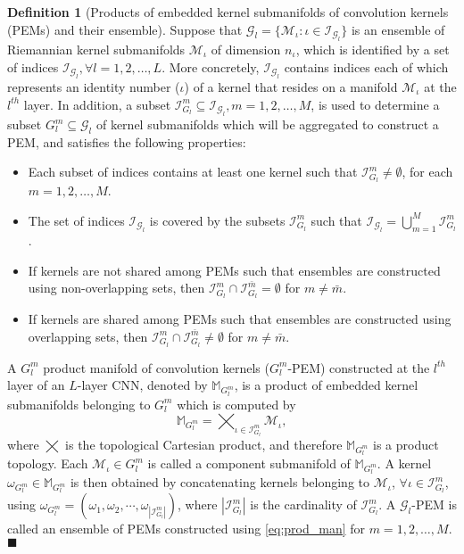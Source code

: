 \documentclass[10pt,journal,compsoc]{IEEEtran}
\theoremstyle{definition}
\newtheorem{definition}[theorem]{Definition}
\theoremstyle{definition}
\theoremstyle{remark}
\theoremstyle{remark}
\theoremstyle{remark}
\newcommand*{\QEDbs}{\hfill\ensuremath{\blacksquare}}%
\begin{document}
\begin{definition}[Products of embedded kernel submanifolds of convolution kernels (PEMs) and their ensemble] 
	Suppose that ${\mathcal{G}_l = \{ \mathcal{M}_{\iota}: \iota \in \mathcal{I}_{\mathcal{G}_l} \}}$ is an ensemble of Riemannian kernel submanifolds $\mathcal{M}_{\iota}$ of dimension $n_{\iota}$, which is identified by a set of indices $\mathcal{I}_{\mathcal{G}_l}, \forall {l=1,2,\ldots,L}$. More concretely, $\mathcal{I}_{\mathcal{G}_l}$ contains indices each of which represents an identity number ($\iota$) of a kernel that resides on a manifold $\mathcal{M}_{\iota}$ at the $l^{th}$ layer. In addition, a subset ${\mathcal{I}_{{G}_l}^m \subseteq \mathcal{I}_{\mathcal{G}_l}}, {m =1,2,\ldots,M}$, is used to determine a subset ${G}^m_l \subseteq \mathcal{G}_l$ of kernel submanifolds  which will be aggregated to construct a PEM, and satisfies the following properties:
	\begin{itemize}
	\item Each subset of indices contains at least one kernel such that ${\mathcal{I}_{{G}_l}^m} \neq \emptyset$, for each $m=1,2,\ldots,M$.	
	\item The set of indices $\mathcal{I}_{\mathcal{G}_l}$ is covered by the subsets ${\mathcal{I}_{{G}_l}^m}$ such that $\mathcal{I}_{\mathcal{G}_l} = \bigcup \limits _{m=1} ^M {\mathcal{I}_{{G}_l}^m}$. 
	\item If kernels are not shared among PEMs such that ensembles are constructed using non-overlapping sets, then $\mathcal{I}_{G_l}^m \cap \mathcal{I}_{{G}_l}^{\bar{m}} = \emptyset$ for $m \neq \bar{m}$.
	\item If kernels are shared among PEMs such that ensembles are constructed using overlapping sets, then ${\mathcal{I}_{G_l}^m \cap \mathcal{I}_{{G}_l}^{\bar{m}} \neq \emptyset}$ for $m \neq \bar{m}$.
	\end{itemize} 
	A $G^m_l$ product manifold of convolution kernels ($G^m_l$-PEM) constructed at the $l^{th}$ layer of an $L$-layer CNN, denoted by $\mathbb{M}_{G^m_l}$, is a product of embedded kernel submanifolds belonging to ${G}^m_l$ which is computed by
\begin{equation}
\mathbb{M}_{G^m_l} = \bigtimes_{\iota \in \mathcal{I}^m_{{G}_l}} \mathcal{M}_{\iota} ,
\label{eq:prod_man}
\end{equation}
where $\bigtimes$ is the topological Cartesian product, and therefore $\mathbb{M}_{G^m_l}$ is a product topology. Each ${\mathcal{M}_{\iota} \in  {G}^m_l}$ is called a component submanifold of $\mathbb{M}_{G^m_l}$. A kernel $\omega_{G^m_l} \in \mathbb{M}_{G^m_l}$ is then obtained by concatenating kernels belonging to $\mathcal{M}_{\iota}$, $\forall \iota \in \mathcal{I}^m_{{G}_l}$, using  ${\omega_{G^m_l} = (\omega_1, \omega_2, \cdots, \omega_{|\mathcal{I}^m_{{G}_l}|})}$, where $|\mathcal{I}^m_{{G}_l}|$ is the cardinality of $\mathcal{I}^m_{{G}_l}$. A $\mathcal{G}_l$-PEM is called an ensemble of PEMs constructed using \eqref{eq:prod_man} for $m=1,2,\ldots,M$. %
\QEDbs
\end{definition}
\end{document}
